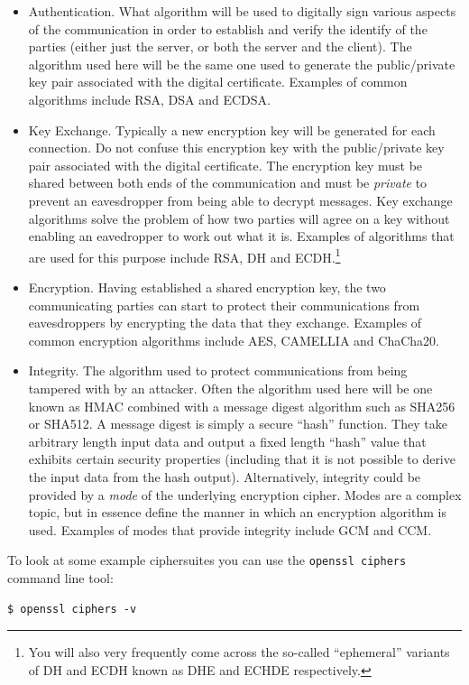 \begin{itemize}
\item Authentication. What algorithm will be used to digitally sign various 
aspects of the communication in order to establish and verify the identify of
the parties (either just the server, or both the server and the client). The 
algorithm used here will be the same one used to generate the public/private 
key pair associated with the digital certificate. Examples of common algorithms 
include RSA, DSA and ECDSA.
\item Key Exchange. Typically a new encryption key will be generated for each
connection. Do not confuse this encryption key with the public/private key pair
associated with the digital certificate. The encryption key must be shared
between both ends of the communication and must be \emph{private} to prevent an
eavesdropper from being able to decrypt messages. Key exchange algorithms solve 
the problem of how two parties will agree on a key without enabling an 
eavedropper to work out what it is. Examples of algorithms that are used for 
this purpose include RSA, DH and ECDH.\footnote{You will also very
frequently come across the so-called ``ephemeral'' variants of DH and ECDH
known as DHE and ECHDE respectively.}
\item Encryption. Having established a shared encryption key, the two 
communicating parties can start to protect their communications from 
eavesdroppers by encrypting the data that they exchange. Examples of common 
encryption algorithms include AES, CAMELLIA and ChaCha20.
\item Integrity. The algorithm used to protect communications from being 
tampered with by an attacker. Often the algorithm used here will be one known 
as HMAC combined with a message digest algorithm such as SHA256 or SHA512. A
message digest is simply a secure ``hash'' function. They take arbitrary 
length input data and output a fixed length ``hash'' value that exhibits 
certain security properties (including that it is not possible to derive the 
input data from the hash output). Alternatively, integrity could be provided by
a \emph{mode} of the underlying  encryption cipher. Modes are a complex topic,
but in essence define the manner in which an encryption algorithm is used.
Examples of modes that provide integrity include GCM and CCM.
\end{itemize}

To look at some example ciphersuites you can use the \lstinline!openssl ciphers!
command line tool:
\begin{verbatim}
$ openssl ciphers -v
\end{verbatim}

